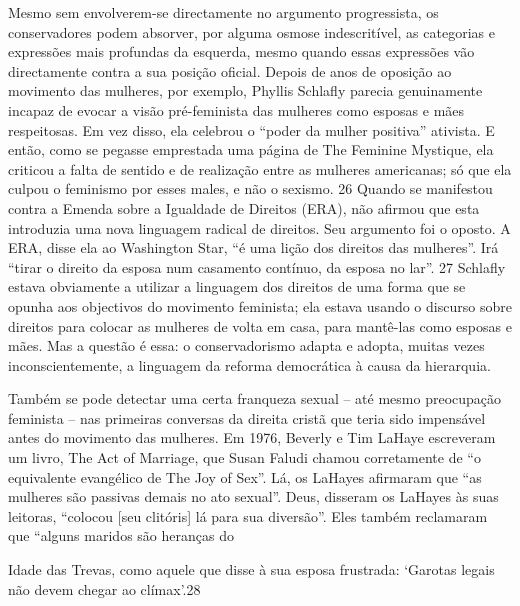  \par 
Mesmo sem envolverem-se directamente no argumento progressista, os conservadores podem absorver, por alguma osmose indescritível, as categorias e expressões mais profundas da esquerda, mesmo quando essas expressões vão directamente contra a sua posição oficial. Depois de anos de oposição ao movimento das mulheres, por exemplo, Phyllis Schlafly parecia genuinamente incapaz de evocar a visão pré-feminista das mulheres como esposas e mães respeitosas. Em vez disso, ela celebrou o “poder da mulher positiva” ativista. E então, como se pegasse emprestada uma página de The Feminine Mystique, ela criticou a falta de sentido e de realização entre as mulheres americanas; só que ela culpou o feminismo por esses males, e não o sexismo. {\color{blue}26} Quando se manifestou contra a Emenda sobre a Igualdade de Direitos (ERA), não afirmou que esta introduzia uma nova linguagem radical de direitos. Seu argumento foi o oposto. A ERA, disse ela ao Washington Star, “é uma lição dos direitos das mulheres”. Irá “tirar o direito da esposa num casamento contínuo, da esposa no lar”. {\color{blue}27} Schlafly estava obviamente a utilizar a linguagem dos direitos de uma forma que se opunha aos objectivos do movimento feminista; ela estava usando o discurso sobre direitos para colocar as mulheres de volta em casa, para mantê-las como esposas e mães. Mas a questão é essa: o conservadorismo adapta e adopta, muitas vezes inconscientemente, a linguagem da reforma democrática à causa da hierarquia.
 \par 
Também se pode detectar uma certa franqueza sexual – até mesmo preocupação feminista – nas primeiras conversas da direita cristã que teria sido impensável antes do movimento das mulheres. Em 1976, Beverly e Tim LaHaye escreveram um livro, The Act of Marriage, que Susan Faludi chamou corretamente de “o equivalente evangélico de The Joy of Sex”. Lá, os LaHayes afirmaram que “as mulheres são passivas demais no ato sexual”. Deus, disseram os LaHayes às suas leitoras, “colocou [seu clitóris] lá para sua diversão”. Eles também reclamaram que “alguns maridos são heranças do
 \par 
Idade das Trevas, como aquele que disse à sua esposa frustrada: ‘Garotas legais não devem chegar ao clímax’.{\color{blue}28}
 \par 
